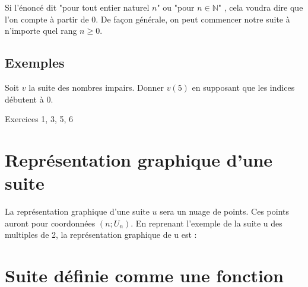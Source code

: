 \documentclass[a4paper,12pt]{article}
\begin{document}
Si l’énoncé dit "pour tout entier naturel $n$" ou "pour $n \in \mathbb{N}$" , cela voudra dire que l’on compte à partir de 0.
De façon générale, on peut commencer notre suite à n’importe quel rang $n \geq 0$.

\subsection*{Exemples}

Soit $v$ la suite des nombres impairs. Donner $v(5)$ en supposant que les indices débutent à 0. \par
\vspace{1em}
{\vspace{2em}}


\begin{tcolorbox}[colback=blue!10!white, colframe=blue!75!black, title=Exercices]
  Exercices 1, 3, 5, 6
\end{tcolorbox}

\section*{Représentation graphique d'une suite}
\vspace{1em}

La représentation graphique d’une suite $u$ sera un nuage de points. Ces points auront pour coordonnées $(n ; U_n)$.
En reprenant l’exemple de la suite u des multiples de 2, la représentation graphique de u est :

{\vspace{7em}}

\section*{Suite définie comme une fonction}
\vspace{1em}
\end{document}
